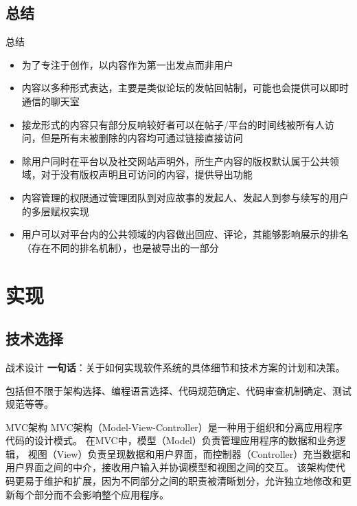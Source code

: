 \documentclass[UTF8]{ctexbeamer}
\begin{document}
\subsection{总结}
\begin{frame}{总结}
\begin{itemize}
  \item 为了专注于创作，以内容作为第一出发点而非用户
  \item 内容以多种形式表达，主要是类似论坛的发帖回帖制，可能也会提供可以即时通信的聊天室
  \item 接龙形式的内容只有部分反响较好者可以在帖子/平台的时间线被所有人访问，但是所有未被删除的内容均可通过链接直接访问
  \item 除用户同时在平台以及社交网站声明外，所生产内容的版权默认属于公共领域，对于没有版权声明且可访问的内容，提供导出功能
  \item 内容管理的权限通过管理团队到对应故事的发起人、发起人到参与续写的用户的多层赋权实现
  \item 用户可以对平台内的公共领域的内容做出回应、评论，其能够影响展示的排名（存在不同的排名机制），也是被导出的一部分
\end{itemize}
\end{frame}

\section{实现}

\subsection{技术选择}

\begin{frame}{战术设计}
\textbf{一句话}：关于如何实现软件系统的具体细节和技术方案的计划和决策。

包括但不限于架构选择、编程语言选择、代码规范确定、代码审查机制确定、测试规范等等。

\begin{block}{MVC架构}
MVC架构（Model-View-Controller）是一种用于组织和分离应用程序代码的设计模式。
在MVC中，模型（Model）负责管理应用程序的数据和业务逻辑\footnotemark[1]，
视图（View）负责呈现数据和用户界面，而控制器（Controller）充当数据和用户界面之间的中介，接收用户输入并协调模型和视图之间的交互。
该架构使代码更易于维护和扩展，因为不同部分之间的职责被清晰划分，允许独立地修改和更新每个部分而不会影响整个应用程序。
\end{block}
\end{frame}
\end{document}

